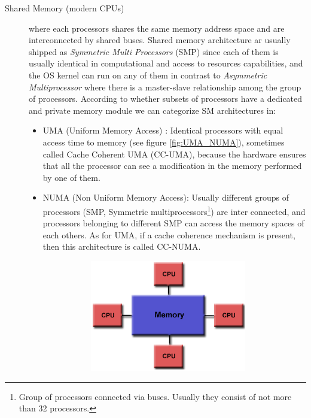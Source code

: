 \begin{description}
\begin{description}
	\item [Shared Memory (modern CPUs)] where each processors shares the same memory address space and are interconnected by shared buses. 
	Shared memory architecture ar usually shipped as \textit{Symmetric Multi Processors} (SMP) since each of them is usually identical in computational and access to resources capabilities, and the OS kernel can run on any of them in contrast to \textit{Asymmetric Multiprocessor} where there is a master-slave relationship  among the group of processors. According to whether subsets of processors have a dedicated and private memory module we can categorize SM architectures in:	
	\begin{itemize}
		\item UMA (Uniform Memory Access) : Identical processors with equal
		access time to memory (see figure \ref{fig:UMA_NUMA}),
		sometimes called  Cache Coherent UMA (CC-UMA), because the
		hardware ensures that all the processor can see a modification in the memory 	performed by one of them.
		\item NUMA (Non Uniform Memory Access): Usually different groups
		of processors (SMP, Symmetric multiprocessors\footnote{Group of processors connected via buses. Usually they consist of not more than 32 processors.}) are inter connected, and processors belonging to different SMP can access the memory spaces of each others. As for UMA, if a cache coherence mechanism  is present, then this architecture is called CC-NUMA.
		 \begin{figure}[b]
			\caption[Shared memory architectures.]{UMA and NUMA shared memory architecture.}
			\label{class12}
			\centering
			\begin{subfigure}[b]{0.5\textwidth}
				\centering
				\includegraphics[width=0.92\textwidth]{./images/parallel_programming/shared_mem}

\end{subfigure}
\end{figure}
\end{itemize}
\end{description}
\end{description}
